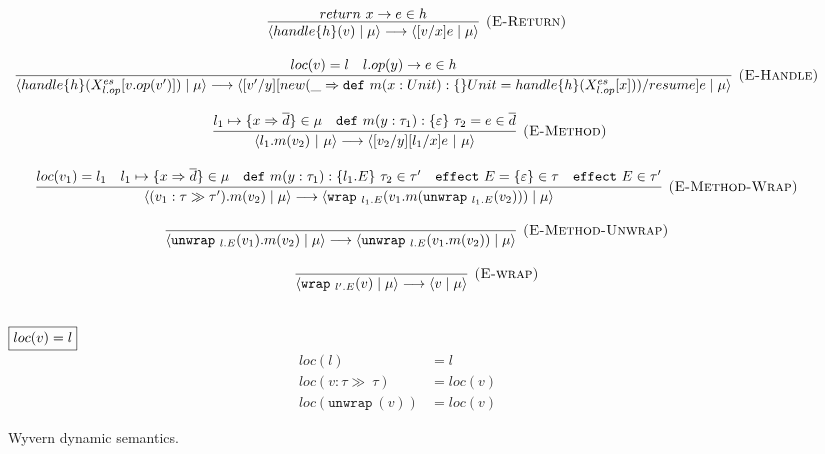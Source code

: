 \documentclass{article}
\theoremstyle{definition}
\newcommand{\keywadj}[1]{\mathtt{#1}}
\newcommand{\keyw}[1]{\keywadj{#1}~}
\begin{document}
\begin{figure}[H]
{\[\begin{array}{c}

\infer[\textsc{(E-Return)}]
  {\langle handle\{h\} (v) \mid \mu \rangle \longrightarrow \langle [v/x]e \mid \mu \rangle}
  {return\ x \rightarrow e \in h}\\[3ex]
  
  \infer[\textsc{(E-Handle)}]
  {\langle handle\{h\} (X^{es}_{l.op}[v.op(v')]) \mid \mu \rangle \longrightarrow \langle [v'/y][new(\_ \Rightarrow \keyw{def} m(x: Unit) : \{\} Unit = handle\{h\}(X_{l.op}^{es}[x]))/resume]e \mid \mu \rangle}
  {loc(v)=l & l.op(y) \rightarrow e \in h }\\[3ex]
  
  \infer[\textsc{(E-Method)}]
  { \langle l_1.m(v_2)~|~\mu \rangle \longrightarrow \langle [v_2/y][l_1/x]e~|~\mu \rangle}
  {   l_1 \mapsto \{ x \Rightarrow \overline{d} \} \in \mu & \keyw{def} m(y : \tau_1) : \{ \varepsilon \}~\tau_2 = e \in \overline{d}}\quad  \\[3ex]
  
  
\infer[\textsc{(E-Method-Wrap)}]
  {\langle (v_1 : \tau \gg \tau').m(v_2) \mid \mu \rangle \longrightarrow \langle \keyw{wrap}_{l_1.E}(v_1.m(\keyw{unwrap}_{l_1.E}(v_2))) \mid \mu \rangle }
  { loc(v_1) = l_1 & l_1 \mapsto \{ x \Rightarrow \overline{d} \} \in \mu & \keyw{def} m(y : \tau_1) : \{ l_1.E \}~\tau_2  \in \tau' & \keyw{effect} E = \{\varepsilon\} \in \tau &  \keyw{effect} E \in \tau'} \\[3ex]
  
  
\infer[\textsc{(E-Method-Unwrap)}]
  {\langle \keyw{unwrap}_{l.E}(v_1).m(v_2) \mid \mu \rangle \longrightarrow  \langle \keyw{unwrap}_{l.E}(v_1.m(v_2)) \mid \mu \rangle }
  {} \\[3ex]
  
  
  
  
\infer[\textsc{(E-wrap)}]
  {\langle \keyw{wrap}_{l'.E}(v) \mid \mu \rangle \longrightarrow \langle v \mid \mu \rangle}
  {} \\[3ex]
\end{array}
\]


\noindent$\fbox{$loc(v) = l$}$
\[
\begin{array}{cc}
loc(l) &= l\\
loc(v:\tau \gg\ \tau) &= loc(v)\\
loc(\keyw{unwrap}(v)) &= loc(v)
\end{array} 
\]
}
\caption{Wyvern dynamic semantics.}
\label{f-effects-dynamic-semantics}
\end{figure}
\end{document}
